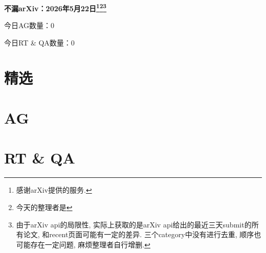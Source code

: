 \documentclass[9pt, a4paper]{article}
\theoremstyle{plain}
\theoremstyle{definition}
\theoremstyle{remark}
\newcommand{\AGnumber}{0}
\newcommand{\RTQAnumber}{0}
\newcommand{\NewestDate}{2026年5月22日}
\newcommand{\todayarXiver}{} %
\begin{document}
\begin{center}
    \Huge\textbf{不漏arXiv：\NewestDate\footnote{感谢arXiv提供的服务.}\footnote{今天的整理者是\todayarXiver}\footnote{由于arXiv api的局限性, 实际上获取的是arXiv api给出的最近三天submit的所有论文, 和recent页面可能有一定的差异. 三个category中没有进行去重, 顺序也可能存在一定问题, 麻烦整理者自行增删.}} \\
\end{center}

\setcounter{section}{-1}

\begin{center}
    今日AG数量：\AGnumber
    
    今日RT \& QA数量：\RTQAnumber
    
\end{center}


\section{精选}


\section{AG}

\section{RT \& QA}
\end{document}
